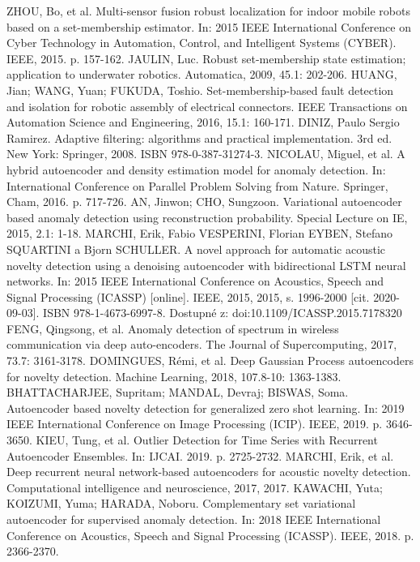 \documentclass[11pt,twoside,openright]{report}
\begin{document}
\begin{thebibliography}{L}
ZHOU, Bo, et al. Multi-sensor fusion robust localization for indoor mobile robots based on a set-membership estimator. In: 2015 IEEE International Conference on Cyber Technology in Automation, Control, and Intelligent Systems (CYBER). IEEE, 2015. p. 157-162.
JAULIN, Luc. Robust set-membership state estimation; application to underwater robotics. Automatica, 2009, 45.1: 202-206.
HUANG, Jian; WANG, Yuan; FUKUDA, Toshio. Set-membership-based fault detection and isolation for robotic assembly of electrical connectors. IEEE Transactions on Automation Science and Engineering, 2016, 15.1: 160-171.
DINIZ, Paulo Sergio Ramirez. Adaptive filtering: algorithms and practical implementation. 3rd ed. New York: Springer, 2008. ISBN 978-0-387-31274-3.
NICOLAU, Miguel, et al. A hybrid autoencoder and density estimation model for anomaly detection. In: International Conference on Parallel Problem Solving from Nature. Springer, Cham, 2016. p. 717-726.
AN, Jinwon; CHO, Sungzoon. Variational autoencoder based anomaly detection using reconstruction probability. Special Lecture on IE, 2015, 2.1: 1-18.
MARCHI, Erik, Fabio VESPERINI, Florian EYBEN, Stefano SQUARTINI a Bjorn SCHULLER. A novel approach for automatic acoustic novelty detection using a denoising autoencoder with bidirectional LSTM neural networks. In: 2015 IEEE International Conference on Acoustics, Speech and Signal Processing (ICASSP) [online]. IEEE, 2015, 2015, s. 1996-2000 [cit. 2020-09-03]. ISBN 978-1-4673-6997-8. Dostupné z: doi:10.1109/ICASSP.2015.7178320
FENG, Qingsong, et al. Anomaly detection of spectrum in wireless communication via deep auto-encoders. The Journal of Supercomputing, 2017, 73.7: 3161-3178.
DOMINGUES, Rémi, et al. Deep Gaussian Process autoencoders for novelty detection. Machine Learning, 2018, 107.8-10: 1363-1383.
BHATTACHARJEE, Supritam; MANDAL, Devraj; BISWAS, Soma. Autoencoder based novelty detection for generalized zero shot learning. In: 2019 IEEE International Conference on Image Processing (ICIP). IEEE, 2019. p. 3646-3650.
KIEU, Tung, et al. Outlier Detection for Time Series with Recurrent Autoencoder Ensembles. In: IJCAI. 2019. p. 2725-2732.
MARCHI, Erik, et al. Deep recurrent neural network-based autoencoders for acoustic novelty detection. Computational intelligence and neuroscience, 2017, 2017.
KAWACHI, Yuta; KOIZUMI, Yuma; HARADA, Noboru. Complementary set variational autoencoder for supervised anomaly detection. In: 2018 IEEE International Conference on Acoustics, Speech and Signal Processing (ICASSP). IEEE, 2018. p. 2366-2370.

\end{thebibliography}
\end{document}
